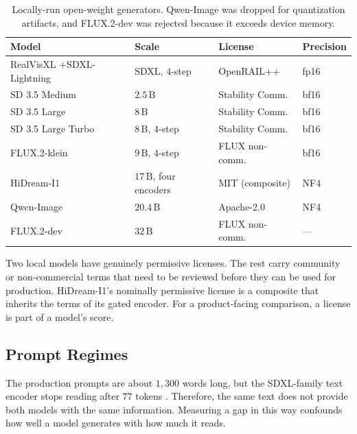 \begin{table}[htbp]
\centering
\caption[Locally-run open-weight generators]{Locally-run open-weight generators. Qwen-Image was dropped for quantization artifacts, and FLUX.2-dev was rejected because it exceeds device memory.}
\label{tab:generator-local-roster}
\begin{tabularx}{\textwidth}{@{}*{4}{>{\raggedright\arraybackslash}X}@{}}
\toprule
Model & Scale & License & Precision \\
\midrule
RealVisXL +\newline SDXL-Lightning \cite{podellSDXLImprovingLatent2023} & SDXL, $4$-step & OpenRAIL++ & fp16 \\
SD 3.5 Medium \cite{esserScalingRectifiedFlow2024} & $2.5\,\mathrm{B}$ & Stability Comm. & bf16 \\
SD 3.5 Large & $8\,\mathrm{B}$ & Stability Comm. & bf16 \\
SD 3.5 Large Turbo & $8\,\mathrm{B}$, $4$-step & Stability Comm. & bf16 \\
FLUX.2-klein \cite{labsBlackForestLabs} & $9\,\mathrm{B}$, $4$-step & FLUX non-comm. & bf16 \\
HiDream-I1 \cite{HiDreamaiHiDreamI1FullHugging2025} & $17\,\mathrm{B}$, four encoders & MIT (composite) & NF4 \\
\midrule
Qwen-Image \cite{QwenQwenImageHugging2025} & $20.4\,\mathrm{B}$ & Apache-2.0 & NF4 \\
FLUX.2-dev & $32\,\mathrm{B}$ & FLUX non-comm. & --- \\
\bottomrule
\end{tabularx}
\end{table}

Two local models have genuinely permissive licenses. The rest carry community or non-commercial terms that need to be reviewed before they can be used for production. HiDream-I1's nominally permissive license is a composite that inherits the terms of its gated encoder. For a product-facing comparison, a license is part of a model's score.

\subsection{Prompt Regimes}\label{sec:generator_comparison_prompts}

The production prompts are about $1{,}300$ words long, but the SDXL-family text encoder stops reading after $77$ tokens \cite{radfordLearningTransferableVisual2021}. Therefore, the same text does not provide both models with the same information. Measuring a gap in this way confounds how well a model generates with how much it reads.

